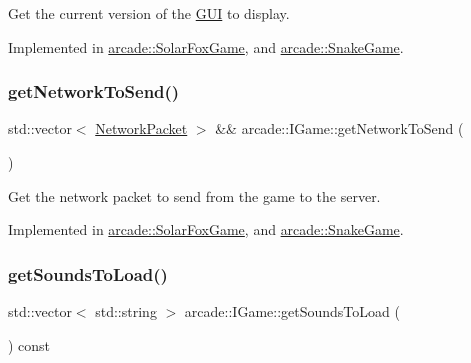 Get the current version of the \hyperlink{classarcade_1_1_g_u_i}{G\+UI} to display. 



Implemented in \hyperlink{classarcade_1_1_solar_fox_game_aba8a5d93b17231c5d2cbbb51cc1d05b9}{arcade\+::\+Solar\+Fox\+Game}, and \hyperlink{classarcade_1_1_snake_game_ab586312d56bab5be7e1506fa513fea44}{arcade\+::\+Snake\+Game}.

\mbox{\label{classarcade_1_1_i_game_a5aa80dfdb3c1881fbc749e3d53efc6f8}} 
\subsubsection{\texorpdfstring{get\+Network\+To\+Send()}{getNetworkToSend()}}
{\footnotesize\ttfamily std\+::vector$<$ \hyperlink{structarcade_1_1_network_packet}{Network\+Packet} $>$ \&\& arcade\+::\+I\+Game\+::get\+Network\+To\+Send (\begin{DoxyParamCaption}{ }\end{DoxyParamCaption})\hspace{0.3cm}{\ttfamily [pure virtual]}}



Get the network packet to send from the game to the server. 



Implemented in \hyperlink{classarcade_1_1_solar_fox_game_a54b56444f83661b4330de868024671d6}{arcade\+::\+Solar\+Fox\+Game}, and \hyperlink{classarcade_1_1_snake_game_a8666c3ad148b7140658b52a262bfab73}{arcade\+::\+Snake\+Game}.

\mbox{\label{classarcade_1_1_i_game_a0b66cd9ef3b5cd0dff95debb7e4f594e}} 
\subsubsection{\texorpdfstring{get\+Sounds\+To\+Load()}{getSoundsToLoad()}}
{\footnotesize\ttfamily std\+::vector$<$ std\+::string $>$ arcade\+::\+I\+Game\+::get\+Sounds\+To\+Load (\begin{DoxyParamCaption}{ }\end{DoxyParamCaption}) const\hspace{0.3cm}{\ttfamily [pure virtual]}}



